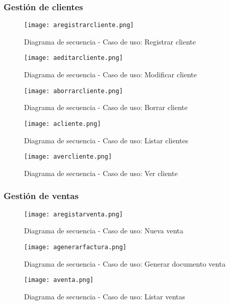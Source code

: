 \clearpage
\subsubsection{Gestión de clientes}
\begin{figure}[!htb]
  \centering
    \texttt{[image: aregistrarcliente.png]}
  \caption{Diagrama de secuencia - Caso de uso: Registrar cliente }
  \label{a}
\end{figure}

\begin{figure}[!htb]
  \centering
    \texttt{[image: aeditarcliente.png]}
  \caption{Diagrama de secuencia - Caso de uso: Modificar cliente }
  \label{a}
\end{figure}

\begin{figure}[!htb]
  \centering
    \texttt{[image: aborrarcliente.png]}
  \caption{Diagrama de secuencia - Caso de uso: Borrar cliente   }
  \label{a}
\end{figure}

\begin{figure}[!htb]
  \centering
    \texttt{[image: acliente.png]}
  \caption{Diagrama de secuencia - Caso de uso: Listar clientes   }
  \label{a}
\end{figure}

\begin{figure}[!htb]
  \centering
    \texttt{[image: avercliente.png]}
  \caption{Diagrama de secuencia - Caso de uso: Ver cliente   }
  \label{a}
\end{figure}

\vspace{15mm}
\subsubsection{Gestión de ventas}
\begin{figure}[!htb]
  \centering
    \texttt{[image: aregistarventa.png]}
  \caption{Diagrama de secuencia - Caso de uso: Nueva venta }
  \label{a}
\end{figure}

\begin{figure}[!htb]
  \centering
    \texttt{[image: agenerarfactura.png]}
  \caption{Diagrama de secuencia - Caso de uso: Generar documento venta }
  \label{a}
\end{figure}

\begin{figure}[!htb]
  \centering
    \texttt{[image: aventa.png]}
  \caption{Diagrama de secuencia - Caso de uso: Listar ventas   }
  \label{a}
\end{figure}

